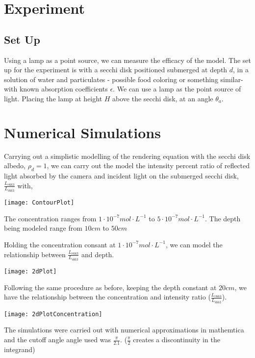 \documentclass{article}
\begin{document}
\section{Experiment}

\subsection{Set Up}
Using a lamp as a point source, we can measure the efficacy of the model. The set up for the experiment is
with a secchi disk positioned submerged at depth $d$, in a solution of water and particulates - possible food coloring
or something similar- with known absorption coefficients $ \epsilon$. We can use a lamp as the point source of light. Placing
the lamp at height $ H$ above the secchi disk, at an angle $\theta_a$.

\section{Numerical Simulations}

Carrying out a simplistic modelling of the rendering equation with the secchi disk albedo, $ \rho_d = 1$,
we can carry out the model the intensity percent ratio of reflected light absorbed by the camera and incident light on
the submerged secchi disk, $ \frac{L_{r663}}{L_{i 663}}$ with,
\begin{center}
    \texttt{[image: ContourPlot]}
\end{center}

The concentration ranges from $ 1 \cdot 10^{-7} mol\cdot L^{-1}$ to $5 \cdot 10^{-7} mol\cdot L^{-1}$. The depth being modeled
range from $10cm$ to $ 50cm$

Holding the concentration consant at $ 1 \cdot 10^{-7} mol\cdot L^{-1}$, we can model the
relationship between $ \frac{L_{r663}}{L_{i663}}$ and depth.
\begin{center}
    \texttt{[image: 2dPlot]}
\end{center}

Following the same procedure as before, keeping the depth constant at $ 20 cm$, we have the relationship between the
concentration and intensity ratio ($ \frac{L_{r663}}{L_{i663}}$).
\begin{center}
  \texttt{[image: 2dPlotConcentration]}
\end{center}

The simulations were carried out with numerical approximations in mathemtica and the cutoff angle angle used was $ \frac{\pi}{2.1}$.
($\frac{\pi}{2}$ creates a discontinuity in the integrand)
\end{document}
